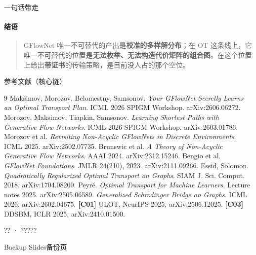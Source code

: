 \documentclass[aspectratio=169,10pt]{beamer}
\begin{document}
\begin{frame}{一句话带走}\framesubtitle{结语}
\begin{quote}\large GFlowNet 唯一不可替代的产出是\textbf{校准的多样解分布}；在 OT 这条线上，它唯一不可替代的位置是\textbf{无法枚举、无法构造代价矩阵的组合图}。在这个位置上给出\textbf{带证书}的传输策略，是目前没人占的那个空位。\end{quote}\vspace{6pt}{\small\textcolor{neutral}{awesome\_Gflow\_OT · reports/INSIGHTS.md · 2026-09}}
\end{frame}
\begin{frame}[shrink=15]{参考文献（核心链）}
\tiny{}
\begin{thebibliography}{9}
 Maksimov, Morozov, Belomestny, Samsonov. \emph{Your GFlowNet Secretly Learns an Optimal Transport Plan}. ICML 2026 SPIGM Workshop. arXiv:2606.06272.
 Morozov, Maksimov, Tiapkin, Samsonov. \emph{Learning Shortest Paths with Generative Flow Networks}. ICML 2026 SPIGM Workshop. arXiv:2603.01786.
 Morozov et al. \emph{Revisiting Non-Acyclic GFlowNets in Discrete Environments}. ICML 2025. arXiv:2502.07735.
 Brunswic et al. \emph{A Theory of Non-Acyclic Generative Flow Networks}. AAAI 2024. arXiv:2312.15246.
 Bengio et al. \emph{GFlowNet Foundations}. JMLR 24(210), 2023. arXiv:2111.09266.
 Essid, Solomon. \emph{Quadratically Regularized Optimal Transport on Graphs}. SIAM J. Sci. Comput. 2018. arXiv:1704.08200.
 Peyr\'e. \emph{Optimal Transport for Machine Learners}. Lecture notes 2025. arXiv:2505.06589.
 \emph{Generalized Schr\"odinger Bridge on Graphs}. ICML 2026. arXiv:2602.04675. \quad \textbf{[C01]} ULOT, NeurIPS 2025, arXiv:2506.12025. \quad \textbf{[C03]} DDSBM, ICLR 2025, arXiv:2410.01500.
\end{thebibliography}
\end{frame}
\begin{frame}[standout]?? · ?????\end{frame}
\appendix
\begin{frame}{Backup Slides}\centering\Large 备份页\end{frame}
\end{document}
